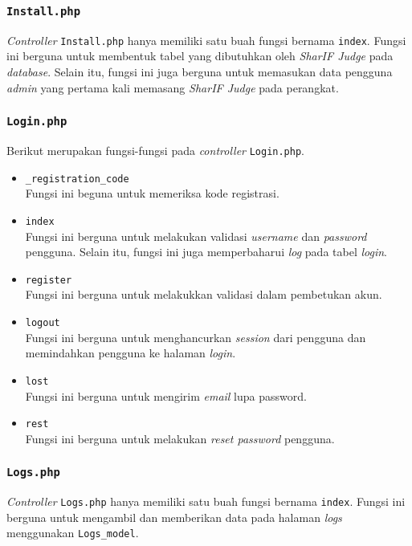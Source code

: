 \subsubsection{\texttt{Install.php}}
\textit{Controller} \texttt{Install.php} hanya memiliki satu buah fungsi bernama \texttt{index}. Fungsi ini berguna untuk membentuk tabel yang dibutuhkan oleh \textit{SharIF Judge} pada \textit{database}. Selain itu, fungsi ini juga berguna untuk memasukan data pengguna \textit{admin} yang pertama kali memasang \textit{SharIF Judge} pada perangkat.

\subsubsection{\texttt{Login.php}}
Berikut merupakan fungsi-fungsi pada \textit{controller} \texttt{Login.php}.
\begin{itemize}
	\item \texttt{\_registration\_code}\\
	Fungsi ini beguna untuk memeriksa kode registrasi.
	\item \texttt{index}\\
	Fungsi ini berguna untuk melakukan validasi \textit{username} dan \textit{password} pengguna. Selain itu, fungsi ini juga memperbaharui \textit{log} pada tabel \textit{login}.
	\item \texttt{register}\\
	Fungsi ini berguna untuk melakukkan validasi dalam pembetukan akun.
	\item \texttt{logout}\\
	Fungsi ini berguna untuk menghancurkan \textit{session} dari pengguna dan memindahkan pengguna ke halaman \textit{login}.
	\item \texttt{lost}\\
	Fungsi ini berguna untuk mengirim \textit{email} lupa password.
	\item \texttt{rest}\\
	Fungsi ini berguna untuk melakukan \textit{reset password} pengguna.
\end{itemize}
\subsubsection{\texttt{Logs.php}}
\textit{Controller} \texttt{Logs.php} hanya memiliki satu buah fungsi bernama \texttt{index}. Fungsi ini berguna untuk mengambil dan memberikan data pada halaman \textit{logs} menggunakan \texttt{Logs\_model}.
